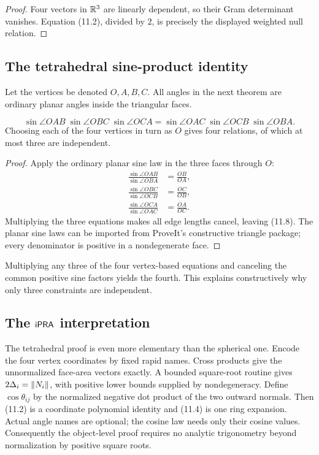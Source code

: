 \begin{proof}
Four vectors in \(\mathbb R^3\) are linearly dependent, so their Gram determinant
vanishes.  Equation (11.2), divided by \(2\), is precisely the displayed
weighted null relation.
\end{proof}

\subsection{The tetrahedral sine-product identity}

Let the vertices be denoted \(O,A,B,C\).  All angles in the next theorem are
ordinary planar angles inside the triangular faces.

\begin{theorem}
\label{thm:tetra-sine}
\begin{equation}
 \sin\angle OAB\;\sin\angle OBC\;\sin\angle OCA
 =\sin\angle OAC\;\sin\angle OCB\;\sin\angle OBA.          \tag{11.8}
\end{equation}
Choosing each of the four vertices in turn as \(O\) gives four relations, of
which at most three are independent.
\end{theorem}

\begin{proof}
Apply the ordinary planar sine law in the three faces through \(O\):
\begin{align*}
 \frac{\sin\angle OAB}{\sin\angle OBA}&=\frac{OB}{OA},\\
 \frac{\sin\angle OBC}{\sin\angle OCB}&=\frac{OC}{OB},\\
 \frac{\sin\angle OCA}{\sin\angle OAC}&=\frac{OA}{OC}.
\end{align*}
Multiplying the three equations makes all edge lengths cancel, leaving (11.8).
The planar sine laws can be imported from ProveIt's constructive triangle
package; every denominator is positive in a nondegenerate face.
\end{proof}

Multiplying any three of the four vertex-based equations and canceling the
common positive sine factors yields the fourth.  This explains constructively
why only three constraints are independent.

\subsection{The \(\mathsf{iPRA}\) interpretation}

The tetrahedral proof is even more elementary than the spherical one.  Encode
the four vertex coordinates by fixed rapid names.  Cross products give the
unnormalized face-area vectors exactly.  A bounded square-root routine gives
\(2\Delta_i=\left\lVert N_i\right\rVert\), with positive lower bounds supplied by
nondegeneracy.  Define \(\cos\theta_{ij}\) by the normalized negative dot
product of the two outward normals.  Then (11.2) is a coordinate polynomial
identity and (11.4) is one ring expansion.  Actual angle names are optional;
the cosine law needs only their cosine values.  Consequently the object-level
proof requires no analytic trigonometry beyond normalization by positive
square roots.
